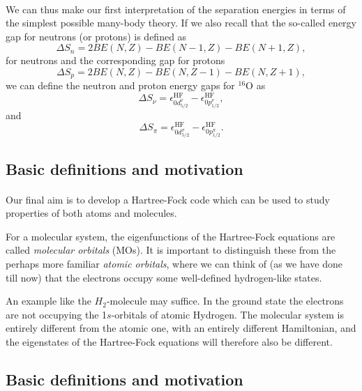 \documentclass[%
twoside,                 %
final,                   %
10pt]{article}
\begin{document}
\paragraph{}
We can thus make our first interpretation of the separation energies in terms of the simplest
possible many-body theory. 
If we also recall that the so-called energy gap for neutrons (or protons) is defined as
\[
\Delta S_n= 2BE(N,Z)-BE(N-1,Z)-BE(N+1,Z),
\]
for neutrons and the corresponding gap for protons
\[
\Delta S_p= 2BE(N,Z)-BE(N,Z-1)-BE(N,Z+1),
\]
we can define the neutron and proton energy gaps for ${}^{16}\mbox{O}$ as
\[
\Delta S_{\nu}=\epsilon_{0d^{\nu}_{5/2}}^{\mathrm{HF}}-\epsilon_{0p^{\nu}_{1/2}}^{\mathrm{HF}}, 
\]
and 
\[
\Delta S_{\pi}=\epsilon_{0d^{\pi}_{5/2}}^{\mathrm{HF}}-\epsilon_{0p^{\pi}_{1/2}}^{\mathrm{HF}}. 
\]





\subsection{Basic definitions and motivation}

\paragraph{}

Our final aim is to develop a Hartree-Fock code which can be used to study properties of
both atoms and molecules.

For a molecular system, the eigenfunctions of the Hartree-Fock equations are called
\emph{molecular orbitals} (MOs). It is important to distinguish these
from the perhaps more familiar \emph{atomic orbitals}, where we can think of (as we have done till now)
that the electrons occupy some well-defined hydrogen-like states.

An example like the $H_2$-molecule may suffice.
In the ground state the electrons are not occupying the 1$s$-orbitals of atomic Hydrogen. The
molecular system is entirely different from the atomic one, with an entirely different Hamiltonian,
and the eigenstates of the Hartree-Fock equations will therefore also be different.







\subsection{Basic definitions and motivation}
\end{document}
